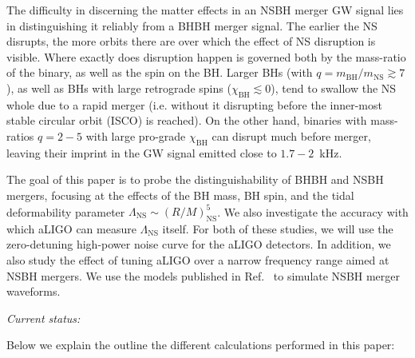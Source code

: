 \documentclass[aps,prd,amsmath,floats,floatfix, twocolumn,
superscriptaddress,nofootinbib,showpacs]{revtex4-1}
\newcommand{\prayush}{\textcolor{red!40!black}}
\newcommand{\NS}{\mathrm{NS}}
\begin{document}
The difficulty in discerning the matter effects in an NSBH merger GW signal
lies in distinguishing it reliably from a BHBH merger signal. The earlier the
NS disrupts, the more orbits there are over which the effect of NS disruption
is visible. Where exactly does disruption happen is governed both by the 
mass-ratio of the binary, as well as the spin on the BH. Larger BHs (with
$q=m_\mathrm{BH}/m_\mathrm{NS}\gtrsim 7$), as well as BHs with large retrograde
spins ($\chi_\mathrm{BH} \lesssim 0$), tend to swallow the NS whole due to a
rapid merger (i.e. without it disrupting before the inner-most stable circular
orbit (ISCO) is reached). On the other hand, binaries with mass-ratios 
$q=2-5$ with large pro-grade $\chi_\mathrm{BH}$ can disrupt much before 
merger, leaving their imprint in the GW signal emitted close to $1.7-2$~kHz.
% 

The goal of this paper is to probe the distinguishability of BHBH and NSBH
mergers, focusing at the effects of the BH mass, BH spin, and the tidal 
deformability parameter $\Lambda_\NS\sim(R/M)^5_\NS$. We also investigate the
accuracy with which aLIGO can measure $\Lambda_\NS$ itself. For both of 
these studies, we will use the zero-detuning high-power noise curve for the
aLIGO detectors. \prayush{In addition, we also study the effect of tuning aLIGO
over a narrow frequency range aimed at NSBH mergers.}
We use the models published in Ref.~\cite{Lackey:2013axa,Pannarale:2015jka} to
simulate NSBH merger waveforms.



\vspace{2cm}

\textit{\prayush{Current status:}}

Below we explain the outline the different calculations performed in this 
paper:
\end{document}
